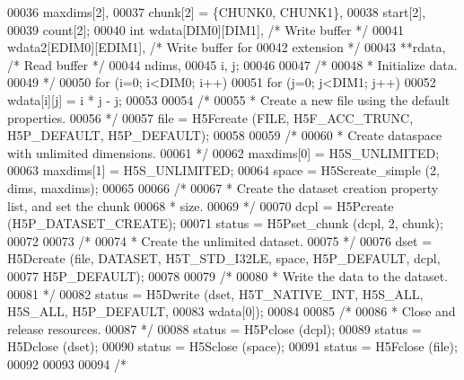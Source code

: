 \begin{DoxyCode}
00036                     maxdims[2],
00037                     chunk[2] = \{CHUNK0, CHUNK1\},
00038                     start[2],
00039                     count[2];
00040     \textcolor{keywordtype}{int}             wdata[DIM0][DIM1],          \textcolor{comment}{/* Write buffer */}
00041                     wdata2[EDIM0][EDIM1],       \textcolor{comment}{/* Write buffer for}
00042 \textcolor{comment}{                                                   extension */}
00043                     **rdata,                    \textcolor{comment}{/* Read buffer */}
00044                     ndims,
00045                     i, j;
00046 
00047     \textcolor{comment}{/*}
00048 \textcolor{comment}{     * Initialize data.}
00049 \textcolor{comment}{     */}
00050     \textcolor{keywordflow}{for} (i=0; i<DIM0; i++)
00051         \textcolor{keywordflow}{for} (j=0; j<DIM1; j++)
00052             wdata[i][j] = i * j - j;
00053 
00054     \textcolor{comment}{/*}
00055 \textcolor{comment}{     * Create a new file using the default properties.}
00056 \textcolor{comment}{     */}
00057     file = H5Fcreate (FILE, H5F\_ACC\_TRUNC, H5P\_DEFAULT, H5P\_DEFAULT);
00058 
00059     \textcolor{comment}{/*}
00060 \textcolor{comment}{     * Create dataspace with unlimited dimensions.}
00061 \textcolor{comment}{     */}
00062     maxdims[0] = H5S\_UNLIMITED;
00063     maxdims[1] = H5S\_UNLIMITED;
00064     space = H5Screate\_simple (2, dims, maxdims);
00065 
00066     \textcolor{comment}{/*}
00067 \textcolor{comment}{     * Create the dataset creation property list, and set the chunk}
00068 \textcolor{comment}{     * size.}
00069 \textcolor{comment}{     */}
00070     dcpl = H5Pcreate (H5P\_DATASET\_CREATE);
00071     status = H5Pset\_chunk (dcpl, 2, chunk);
00072 
00073     \textcolor{comment}{/*}
00074 \textcolor{comment}{     * Create the unlimited dataset.}
00075 \textcolor{comment}{     */}
00076     dset = H5Dcreate (file, DATASET, H5T\_STD\_I32LE, space, H5P\_DEFAULT, dcpl,
00077                 H5P\_DEFAULT);
00078 
00079     \textcolor{comment}{/*}
00080 \textcolor{comment}{     * Write the data to the dataset.}
00081 \textcolor{comment}{     */}
00082     status = H5Dwrite (dset, H5T\_NATIVE\_INT, H5S\_ALL, H5S\_ALL, H5P\_DEFAULT,
00083                 wdata[0]);
00084 
00085     \textcolor{comment}{/*}
00086 \textcolor{comment}{     * Close and release resources.}
00087 \textcolor{comment}{     */}
00088     status = H5Pclose (dcpl);
00089     status = H5Dclose (dset);
00090     status = H5Sclose (space);
00091     status = H5Fclose (file);
00092 
00093 
00094     \textcolor{comment}{/*}

\end{DoxyCode}
